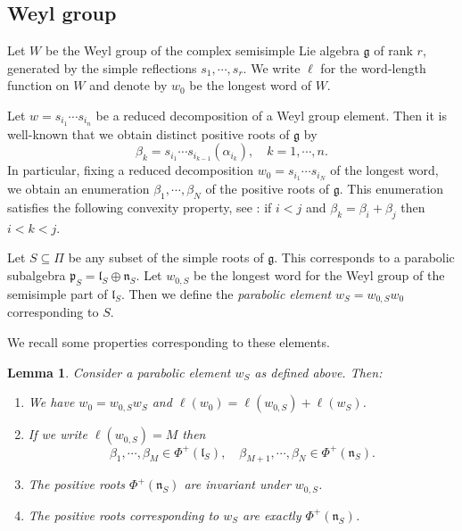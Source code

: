 \documentclass[a4paper, 12pt, reqno, english]{amsart}
\numberwithin{equation}{section}
\numberwithin{figure}{section}
\theoremstyle{plain}
\theoremstyle{plain}
\theoremstyle{plain}
\theoremstyle{plain}
\newtheorem{lemma}[theorem]{Lemma}
\theoremstyle{plain}
\theoremstyle{definition}
\theoremstyle{definition}
\theoremstyle{definition}
\theoremstyle{remark}
\theoremstyle{definition}
\theoremstyle{definition}
\newcommand{\lieg}{\mathfrak{g}}
\newcommand{\liel}{\mathfrak{l}}
\newcommand{\lien}{\mathfrak{n}}
\newcommand{\liep}{\mathfrak{p}}
\newcommand{\roots}{\Phi}
\newcommand{\simpleroots}{\Pi}
\begin{document}
\subsection{Weyl group}

Let $W$ be the Weyl group of the complex semisimple Lie algebra $\lieg$ of rank $r$, generated by the simple reflections $s_1, \cdots, s_r$.
We write $\ell$ for the word-length function on $W$ and denote by $w_0$ be the longest word of $W$.

Let $w = s_{i_1} \cdots s_{i_n}$ be a reduced decomposition of a Weyl group element. Then it is well-known that we obtain distinct positive roots of $\lieg$ by
\[
\beta_k = s_{i_1} \cdots s_{i_{k - 1}} (\alpha_{i_k}), \quad
k = 1, \cdots, n.
\]
In particular, fixing a reduced decomposition $w_0 = s_{i_1} \cdots s_{i_N}$ of the longest word,  we obtain an enumeration $\beta_1, \cdots, \beta_N$ of the positive roots of $\lieg$.
This enumeration satisfies the following convexity property, see \cite{papi}: if $i < j$ and $\beta_k = \beta_i + \beta_j$ then $i < k < j$.

Let $S \subseteq \simpleroots$ be any subset of the simple roots of $\lieg$.
This corresponds to a parabolic subalgebra $\liep_S = \liel_S \oplus \lien_S$.
Let $w_{0, S}$ be the longest word for the Weyl group of the semisimple part of $\liel_S$.
Then we define the \emph{parabolic element} $w_S = w_{0, S} w_0$ corresponding to $S$.

We recall some properties corresponding to these elements.

\begin{lemma}
Consider a parabolic element $w_S$ as defined above. Then:
\begin{enumerate}
\item We have $w_0 = w_{0, S} w_S$ and $\ell(w_0) = \ell(w_{0, S}) + \ell(w_S)$.
\item If we write $\ell(w_{0, S}) = M$ then
\[
\beta_1, \cdots, \beta_M \in \roots^+(\liel_S), \quad
\beta_{M + 1}, \cdots, \beta_N \in \roots^+(\lien_S).
\]
\item The positive roots $\roots^+(\lien_S)$ are invariant under $w_{0, S}$.
\item The positive roots corresponding to $w_S$ are exactly $\roots^+(\lien_S)$.
\end{enumerate}
\end{lemma}
\end{document}
